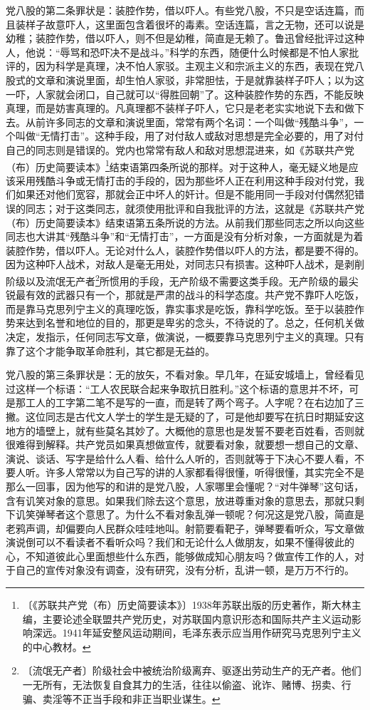 \documentclass[12pt,UTF-8,openany]{ctexbook}
\begin{document}
\begin{normalsize}
    党八股的第二条罪状是：装腔作势，借以吓人。有些党八股，不只是空话连篇，而且装样子故意吓人，这里面包含着很坏的毒素。空话连篇，言之无物，还可以说是幼稚；装腔作势，借以吓人，则不但是幼稚，简直是无赖了。鲁迅曾经批评过这种人，他说：“辱骂和恐吓决不是战斗。”科学的东西，随便什么时候都是不怕人家批评的，因为科学是真理，决不怕人家驳。主观主义和宗派主义的东西，表现在党八股式的文章和演说里面，却生怕人家驳，非常胆怯，于是就靠装样子吓人；以为这一吓，人家就会闭口，自己就可以“得胜回朝”了。这种装腔作势的东西，不能反映真理，而是妨害真理的。凡真理都不装样子吓人，它只是老老实实地说下去和做下去。从前许多同志的文章和演说里面，常常有两个名词：一个叫做“残酷斗争”，一个叫做“无情打击”。这种手段，用了对付敌人或敌对思想是完全必要的，用了对付自己的同志则是错误的。党内也常常有敌人和敌对思想混进来，如《苏联共产党（布）历史简要读本》\footnote{〔《苏联共产党（布）历史简要读本》〕1938年苏联出版的历史著作，斯大林主编，主要论述全联盟共产党历史，对苏联国内意识形态和国际共产主义运动影响深远。1941年延安整风运动期间，毛泽东表示应当用作研究马克思列宁主义的中心教材。}结束语第四条所说的那样。对于这种人，毫无疑义地是应该采用残酷斗争或无情打击的手段的，因为那些坏人正在利用这种手段对付党，我们如果还对他们宽容，那就会正中坏人的奸计。但是不能用同一手段对付偶然犯错误的同志；对于这类同志，就须使用批评和自我批评的方法，这就是《苏联共产党（布）历史简要读本》结束语第五条所说的方法。从前我们那些同志之所以向这些同志也大讲其“残酷斗争”和“无情打击”，一方面是没有分析对象，一方面就是为着装腔作势，借以吓人。无论对什么人，装腔作势借以吓人的方法，都是要不得的。因为这种吓人战术，对敌人是毫无用处，对同志只有损害。这种吓人战术，是剥削阶级以及流氓无产者\footnote{〔流氓无产者〕阶级社会中被统治阶级离弃、驱逐出劳动生产的无产者。他们一无所有，无法恢复自食其力的生活，往往以偷盗、讹诈、赌博、拐卖、行骗、卖淫等不正当手段和非正当职业谋生。}所惯用的手段，无产阶级不需要这类手段。无产阶级的最尖锐最有效的武器只有一个，那就是严肃的战斗的科学态度。共产党不靠吓人吃饭，而是靠马克思列宁主义的真理吃饭，靠实事求是吃饭，靠科学吃饭。至于以装腔作势来达到名誉和地位的目的，那更是卑劣的念头，不待说的了。总之，任何机关做决定，发指示，任何同志写文章，做演说，一概要靠马克思列宁主义的真理。只有靠了这个才能争取革命胜利，其它都是无益的。
    
    党八股的第三条罪状是：无的放矢，不看对象。早几年，在延安城墙上，曾经看见过这样一个标语：“工人农民联合起来争取抗日胜利。”这个标语的意思并不坏，可是那工人的工字第二笔不是写的一直，而是转了两个弯子。人字呢？在右边加了三撇。这位同志是古代文人学士的学生是无疑的了，可是他却要写在抗日时期延安这地方的墙壁上，就有些莫名其妙了。大概他的意思也是发誓不要老百姓看，否则就很难得到解释。共产党员如果真想做宣传，就要看对象，就要想一想自己的文章、演说、谈话、写字是给什么人看、给什么人听的，否则就等于下决心不要人看，不要人听。许多人常常以为自己写的讲的人家都看得很懂，听得很懂，其实完全不是那么一回事，因为他写的和讲的是党八股，人家哪里会懂呢？“对牛弹琴”这句话，含有讥笑对象的意思。如果我们除去这个意思，放进尊重对象的意思去，那就只剩下讥笑弹琴者这个意思了。为什么不看对象乱弹一顿呢？何况这是党八股，简直是老鸦声调，却偏要向人民群众哇哇地叫。射箭要看靶子，弹琴要看听众，写文章做演说倒可以不看读者不看听众吗？我们和无论什么人做朋友，如果不懂得彼此的心，不知道彼此心里面想些什么东西，能够做成知心朋友吗？做宣传工作的人，对于自己的宣传对象没有调查，没有研究，没有分析，乱讲一顿，是万万不行的。
    

\end{normalsize}
\end{document}

